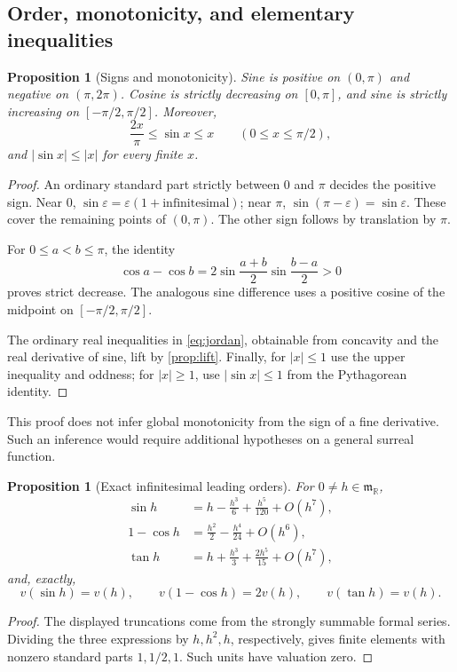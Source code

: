 \documentclass[11pt]{article}
\numberwithin{equation}{section}
\newtheorem{proposition}[theorem]{Proposition}
\theoremstyle{definition}
\newcommand{\R}{\mathbb R}
\newcommand{\mm}{\mathfrak m}
\newcommand{\eps}{\varepsilon}
\begin{document}
\subsection{Order, monotonicity, and elementary inequalities}
\begin{proposition}[Signs and monotonicity]\label{prop:order}
Sine is positive on $(0,\pi)$ and negative on $(\pi,2\pi)$. Cosine is strictly decreasing on $[0,\pi]$, and sine is strictly increasing on $[-\pi/2,\pi/2]$. Moreover,
\begin{equation}\label{eq:jordan}
 \frac{2x}{\pi}\le\sin x\le x\qquad(0\le x\le\pi/2),
\end{equation}
and $|\sin x|\le|x|$ for every finite $x$.
\end{proposition}
\begin{proof}
An ordinary standard part strictly between $0$ and $\pi$ decides the positive sign. Near $0$, $\sin\eps=\eps(1+\text{infinitesimal})$; near $\pi$, $\sin(\pi-\eps)=\sin\eps$. These cover the remaining points of $(0,\pi)$. The other sign follows by translation by $\pi$.

For $0\le a<b\le\pi$, the identity
\[
 \cos a-\cos b=2\sin\frac{a+b}{2}\sin\frac{b-a}{2}>0
\]
proves strict decrease. The analogous sine difference uses a positive cosine of the midpoint on $[-\pi/2,\pi/2]$.

The ordinary real inequalities in \eqref{eq:jordan}, obtainable from concavity and the real derivative of sine, lift by \cref{prop:lift}. Finally, for $|x|\le1$ use the upper inequality and oddness; for $|x|\ge1$, use $|\sin x|\le1$ from the Pythagorean identity.
\end{proof}
This proof does not infer global monotonicity from the sign of a fine derivative. Such an inference would require additional hypotheses on a general surreal function.

\begin{proposition}[Exact infinitesimal leading orders]\label{prop:leading}
For $0\ne h\in\mm_{\R}$,
\begin{align}
 \sin h&=h-\frac{h^3}{6}+\frac{h^5}{120}+O(h^7),\\
 1-\cos h&=\frac{h^2}{2}-\frac{h^4}{24}+O(h^6),\\
 \tan h&=h+\frac{h^3}{3}+\frac{2h^5}{15}+O(h^7),
\end{align}
and, exactly,
\begin{equation}\label{eq:sinval}
 v(\sin h)=v(h),\qquad
 v(1-\cos h)=2v(h),\qquad v(\tan h)=v(h).
\end{equation}
\end{proposition}
\begin{proof}
The displayed truncations come from the strongly summable formal series. Dividing the three expressions by $h,h^2,h$, respectively, gives finite elements with nonzero standard parts $1,1/2,1$. Such units have valuation zero.
\end{proof}
\end{document}
